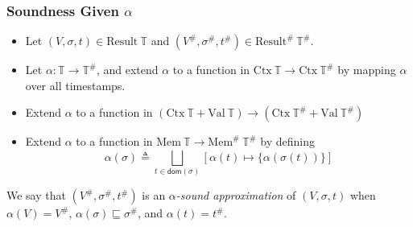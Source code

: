 \documentclass{beamer}
\newcommand*{\A}[1]{{#1}^{\#}}
\newcommand*{\Time}{\mathbb{T}}
\newcommand*{\ATime}{\A{\Time}}
\newcommand*{\Ctx}[1]{\text{Ctx}\:{#1}}
\newcommand*{\Value}[1]{\text{Val}\:{#1}}
\newcommand*{\Mem}[1]{\text{Mem}\:{#1}}
\newcommand*{\AMem}[1]{\A{\text{Mem}}\:{#1}}
\newcommand*{\Result}[1]{\text{Result}\:{#1}}
\newcommand*{\AResult}[1]{\A{\text{Result}}\:{#1}}
\begin{document}
\begin{frame}[c]
  \frametitle{Soundness Given $\alpha$}
  \begin{definition}
    \begin{itemize}
      \item Let $(V,\sigma,t)\in\Result{\Time}$ and $(\A{V},\A\sigma,\A{t})\in\AResult{\ATime}$.
      \item Let $\alpha:\Time\rightarrow\ATime$, and extend $\alpha$ to a function in $\Ctx{\Time}\rightarrow\Ctx{\ATime}$ by mapping $\alpha$ over all timestamps.
      \item Extend $\alpha$ to a function in $(\Ctx{\Time}+\Value{\Time})\rightarrow(\Ctx{\ATime}+\Value{\ATime})$
      \item Extend $\alpha$ to a function in $\Mem{\Time}\rightarrow\AMem{\ATime}$ by defining
            \[\alpha(\sigma)\triangleq\bigsqcup_{t\in\mathsf{dom}(\sigma)}[\alpha(t)\mapsto\{\alpha(\sigma(t))\}]\]
    \end{itemize}

    We say that $(\A{V},\A\sigma,\A{t})$ is an \emph{$\alpha$-sound approximation} of $(V,\sigma,t)$ when $\alpha(V)=\A{V}$, $\alpha(\sigma)\sqsubseteq\A\sigma$, and $\alpha(t)=\A{t}$.
  \end{definition}
\end{frame}
\end{document}
